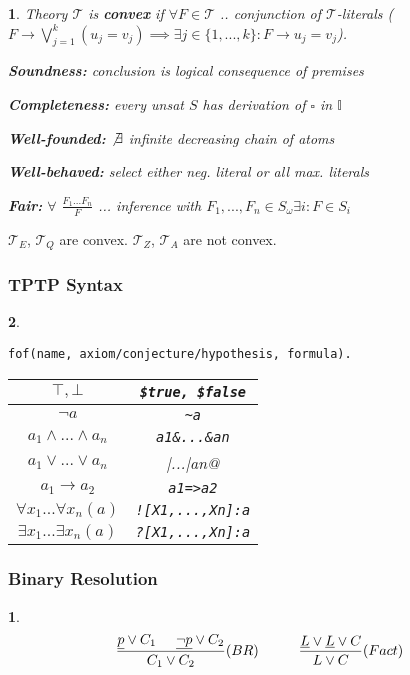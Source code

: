 \documentclass[]{article}
\newtheorem*{green}{}
\newtheorem*{blue}{}
\begin{document}
\begin{multicols}{3}
\begin{minipage}[t]{.31\textwidth}
\begin{green}
Theory $\mathcal{T}$ is \textbf{convex} if $\forall F \in \mathcal{T}$ .. conjunction of $\mathcal{T}$-literals ($F \rightarrow \bigvee_{j=1}^k(u_j = v_j) \implies \exists j\in\{1,...,k\}: F \rightarrow u_j = v_j$).

\textbf{Soundness:} conclusion is logical consequence of premises

\textbf{Completeness:} every unsat $S$ has derivation of $\square$ in $\mathbb{I}$

\textbf{Well-founded:} $\not\exists$ infinite decreasing chain of atoms

\textbf{Well-behaved:} select either neg. literal or all max. literals

\textbf{Fair:} $\forall$ $\frac{F_1...F_n}{F}$ ... inference with $F_1,...,F_n \in S_\omega \exists i: F \in S_i$
\end{green}

$\mathcal{T}_E$, $\mathcal{T}_Q$ are convex. $\mathcal{T}_Z$, $\mathcal{T}_A$ are not convex.

\subsubsection*{TPTP Syntax}
\begin{green}
	
\begin{verbatim}
fof(name, axiom/conjecture/hypothesis, formula).
\end{verbatim}

\begin{tabular}{c|c}
	$\top, \bot$ & \verb|$true, $false|\\
	\hline
	$\lnot a$ & \verb|~a|\\
	\hline
	$a_1 \land ... \land a_n$ & \verb|a1&...&an|\\
	\hline
	$a_1 \lor ... \lor a_n$ & \verb@a1|...|an@\\
	\hline
	$a_1 \rightarrow a_2$ & \verb|a1=>a2|\\
	\hline
	$\forall x_1 ... \forall x_n (a)$ & \verb|![X1,...,Xn]:a|\\
	\hline
	$\exists x_1 ... \exists x_n (a)$ & \verb|?[X1,...,Xn]:a|\\
	\hline
\end{tabular}
\end{green}

\subsubsection*{Binary Resolution}
\begin{blue}
\begin{align*}
	\frac{\underline{p}\lor C_1 \hspace{.5cm} \underline{\lnot p} \lor C_2}{C_1 \lor C_2} (BR) \hspace{1cm} \frac{\underline{L}\lor \underline{L} \lor C}{L \lor C} (Fact)
\end{align*}
\end{blue}


\end{minipage}
\end{multicols}
\end{document}
